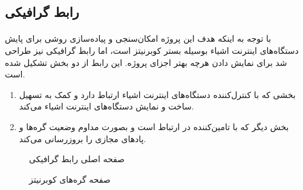 \subsection{رابط گرافیکی}
\label{subsec:gui}
\paragraph{}
{
    با توجه به اینکه هدف این پروژه امکان‌سنجی و پیاده‌سازی روشی برای پایش دستگاه‌های اینترنت اشیاء بوسیله بستر کوبرنیتز است، اما رابط گرافیکی نیز طراحی شد برای
    نمایش دادن هرچه بهتر اجزای پروژه. این رابط از دو بخش تشکیل شده است.
    \begin{enumerate}
        \item بخشی که با کنترل‌کننده دستگاه‌های اینترنت اشیاء ارتباط دارد و کمک به تسهیل ساخت و نمایش دستگاه‌‌های اینترنت اشیاء می‌کند.
        \item بخش دیگر که با تامین‌کننده در ارتباط است و بصورت مداوم وضعیت گره‌ها و پاد‌های مجازی را بروزرسانی می‌کند.
    \end{enumerate}

    \begin{figure}[H]
        \caption{صفحه اصلی رابط گرافیکی}
        \label{fig:dash_home}
    \end{figure}

    \begin{figure}[H]
        \caption{صفحه گره‌های کوبرنیتز}
        \label{fig:dash_nodes}
    \end{figure}

}
